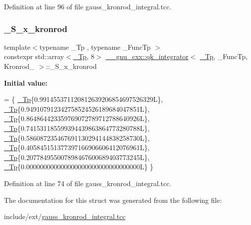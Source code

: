 Definition at line 96 of file gauss\+\_\+kronrod\+\_\+integral.\+tcc.

\mbox{\label{struct____gnu__cxx_1_1qk__integrator_3_01__Tp_00_01__FuncTp_00_01Kronrod__15_01_4_a300459f400f0ca243e6817105ab79f27}} 
\subsubsection{\texorpdfstring{\+\_\+\+S\+\_\+x\+\_\+kronrod}{\_S\_x\_kronrod}}
{\footnotesize\ttfamily template$<$typename \+\_\+\+Tp , typename \+\_\+\+Func\+Tp $>$ \\
constexpr std\+::array$<$\hyperlink{namespace____gnu__cxx_a3b19a9c800ca194374ef9172290f7d79}{\+\_\+\+Tp}, 8$>$ \hyperlink{class____gnu__cxx_1_1qk__integrator}{\+\_\+\+\_\+gnu\+\_\+cxx\+::qk\+\_\+integrator}$<$ \hyperlink{namespace____gnu__cxx_a3b19a9c800ca194374ef9172290f7d79}{\+\_\+\+Tp}, \+\_\+\+Func\+Tp, Kronrod\+\_ $>$\+::\+\_\+\+S\+\_\+x\+\_\+kronrod\hspace{0.3cm}{\ttfamily [static]}}

{\bfseries Initial value\+:}
\begin{DoxyCode}
=
      \{
        \hyperlink{namespace____gnu__cxx_a3b19a9c800ca194374ef9172290f7d79}{\_Tp}\{0.991455371120812639206854697526329L\},
        \hyperlink{namespace____gnu__cxx_a3b19a9c800ca194374ef9172290f7d79}{\_Tp}\{0.949107912342758524526189684047851L\},
        \hyperlink{namespace____gnu__cxx_a3b19a9c800ca194374ef9172290f7d79}{\_Tp}\{0.864864423359769072789712788640926L\},
        \hyperlink{namespace____gnu__cxx_a3b19a9c800ca194374ef9172290f7d79}{\_Tp}\{0.741531185599394439863864773280788L\},
        \hyperlink{namespace____gnu__cxx_a3b19a9c800ca194374ef9172290f7d79}{\_Tp}\{0.586087235467691130294144838258730L\},
        \hyperlink{namespace____gnu__cxx_a3b19a9c800ca194374ef9172290f7d79}{\_Tp}\{0.405845151377397166906606412076961L\},
        \hyperlink{namespace____gnu__cxx_a3b19a9c800ca194374ef9172290f7d79}{\_Tp}\{0.207784955007898467600689403773245L\},
        \hyperlink{namespace____gnu__cxx_a3b19a9c800ca194374ef9172290f7d79}{\_Tp}\{0.000000000000000000000000000000000L\}
      \}
\end{DoxyCode}


Definition at line 74 of file gauss\+\_\+kronrod\+\_\+integral.\+tcc.



The documentation for this struct was generated from the following file\+:\begin{DoxyCompactItemize}
\item 
include/ext/\hyperlink{gauss__kronrod__integral_8tcc}{gauss\+\_\+kronrod\+\_\+integral.\+tcc}\end{DoxyCompactItemize}
